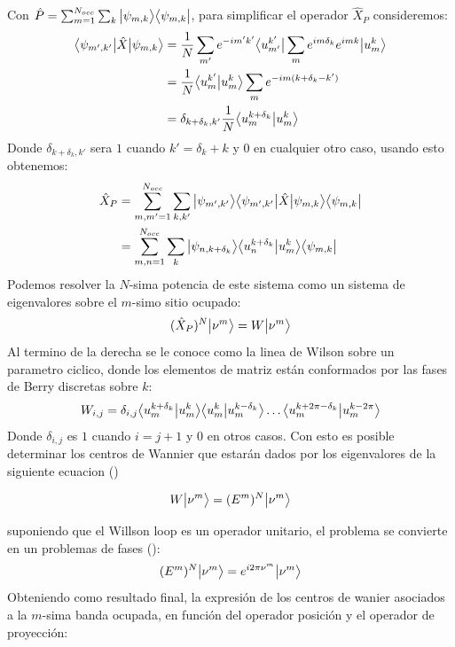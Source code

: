 Con $\hat{P} = \sum_{m = 1}^{N_{occ}} \sum_{k} \big |{\psi_{m,k}}\big \rangle \big \langle{\psi_{m,k}}\big |$, para simplificar el operador $\hat{X}_P$  consideremos:
\begin{align}
    \big \langle{\psi_{m',k'}}\big | {\hat{X}} \big | {\psi_{m,k}} \big \rangle &= \frac{1}{N} \sum_{m'} e^{-im'k'} \big \langle{u_{m'}^{k'}}\big |   \sum_{m} e^{im\delta_k} e^{imk}  \big |{u_{m}^{k}}\big \rangle \nonumber \\
    &=  \frac{1}{N} \big \langle{u_{m}^{k'}}\big | {u_{m}^{k}} \big \rangle \sum_{m} e^{-im(k + \delta_k - k')} \nonumber \\
    &= \delta_{k + \delta_k, k'} \frac{1}{N} \big \langle{u_{m}^{k + \delta_k}}\big | {u_{m}^{k}} \big \rangle  
\end{align}
Donde $\delta_{k + \delta_k, k'}$ sera $1$ cuando $k' = \delta_k + k$ y $0$ en cualquier otro caso, usando esto obtenemos:
\begin{align}
    \hat{X}_P &=  \sum_{m,m'=1}^{N_{occ}} \sum_{k,k'} \big |{\psi_{m',k'}}\big \rangle \big \langle{\psi_{m',k'}}\big | \hat{X} \big |{\psi_{m,k}}\big \rangle \big \langle{\psi_{m,k}}\big | \nonumber \\
    &= \sum_{m,n = 1}^{N_{occ}} \sum_{k} \big |{\psi_{n,k + \delta_k}}\big \rangle \big \langle{u_{n}^{k +\delta_k}}\big | {u_{m}^{k}} \big \rangle \big \langle{\psi_{m,k}}\big |
\end{align}
Podemos resolver la $N$-sima potencia de este sistema como un sistema de eigenvalores sobre el $m$-simo sitio ocupado:
\begin{equation}
    (\hat{X}_P)^N \big |{\nu^m}\big \rangle =  W \big |{\nu^m}\big \rangle
\end{equation}
Al termino de la derecha se le conoce como la linea de Wilson sobre un parametro ciclico, donde los elementos de matriz están conformados por las fases de Berry discretas sobre $k$:
\begin{equation}
    W_{i,j} = \delta_{i,j} \big \langle{u_m^{k+\delta_k}}\big | {u_m^{k}} \big \rangle \big \langle{u_m^{k}}\big | {u_m^{k-\delta_k}} \big \rangle \dots \big \langle{u_m^{k +2\pi -\delta_k}}\big | {u_m^{k-2\pi}} \big \rangle 
\end{equation}
Donde $\delta_{i,j}$ es $1$ cuando $i = j+1$ y $0$ en otros casos. Con esto es posible determinar los centros de Wannier que estarán dados por los eigenvalores de la siguiente ecuacion ()

\begin{equation}
    W \big |{\nu^m}\big \rangle=(E^m)^N \big |{\nu^m}\big \rangle
\end{equation}

suponiendo que el Willson loop es un operador unitario, el problema se convierte en un problemas de fases ():
\begin{equation}
    (E^m)^N \big |{\nu^m}\big \rangle = e^{i2\pi\nu^m} \big |{\nu^m}\big \rangle
\end{equation}
Obteniendo como resultado final, la expresión de los centros de wanier asociados a la $m$-sima banda ocupada, en función del operador posición y el operador de proyección:

